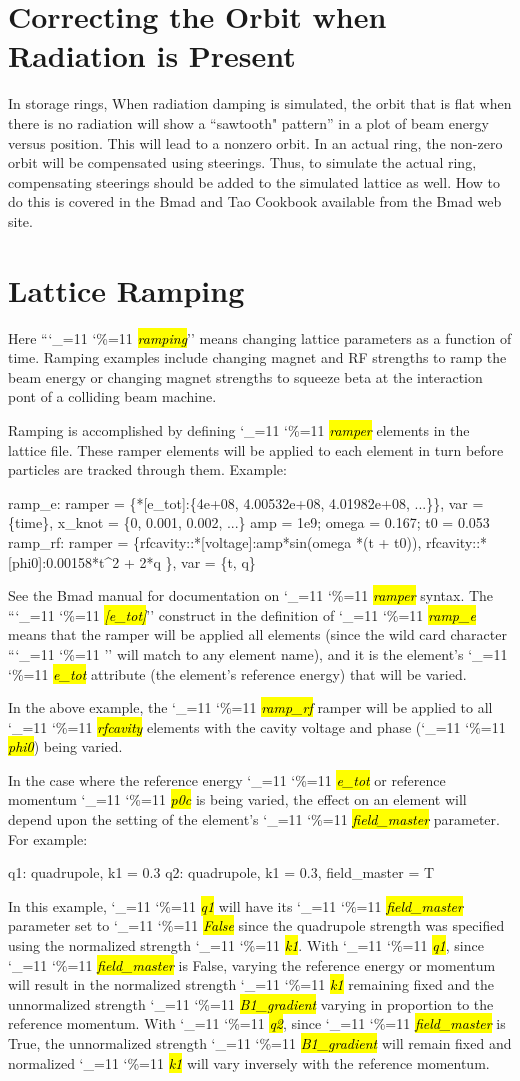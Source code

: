 \documentclass{hitec}
\newcommand\dottcmd[1]{\hl{\em#1}\endgroup}
\newcommand{\vn}{\begingroup\catcode`\_=11 \catcode`\%=11 \dottcmd}
\newcommand{\Section}[1]{\section{#1}\vspace*{-1ex}}
\begin{document}
{{{{{{{{{{%
\Section{Correcting the Orbit when Radiation is Present}

In storage rings, When radiation damping is simulated, the orbit that is flat when there is no
radiation will show a ``sawtooth" pattern'' in a plot of beam energy versus position. This will lead
to a nonzero orbit. In an actual ring, the non-zero orbit will be compensated using steerings. Thus,
to simulate the actual ring, compensating steerings should be added to the simulated lattice as
well. How to do this is covered in the Bmad and Tao Cookbook available from the Bmad web site.

\Section{Lattice Ramping}
\label{s:ramp}

Here ``\vn{ramping}'' means changing lattice parameters as a function of time. Ramping examples
include changing magnet and RF strengths to ramp the beam energy or changing magnet strengths to
squeeze beta at the interaction pont of a colliding beam machine.

Ramping is accomplished by defining \vn{ramper} elements in the lattice file. These ramper elements
will be applied to each element in turn before particles are tracked through them. Example:
\begin{code}
  ramp_e: ramper = \{*[e_tot]:\{4e+08, 4.00532e+08, 4.01982e+08, ...\}\},
                var = \{time\}, x_knot = \{0, 0.001, 0.002, ...\}
  amp = 1e9;  omega = 0.167;  t0 = 0.053
  ramp_rf: ramper = \{rfcavity::*[voltage]:amp*sin(omega *(t + t0)),
        rfcavity::*[phi0]:0.00158*t^2 + 2*q \}, var = \{t, q\}
\end{code}
See the Bmad manual for documentation on \vn{ramper} syntax. The ``\vn{*[e_tot]}'' construct in the
definition of \vn{ramp_e} means that the ramper will be applied all elements (since the wild card
character ``\vn{*}'' will match to any element name), and it is the element's \vn{e_tot} attribute
(the element's reference energy) that will be varied.

In the above example, the \vn{ramp_rf} ramper will be applied to all \vn{rfcavity} elements with
the cavity voltage and phase (\vn{phi0}) being varied.

In the case where the reference energy \vn{e_tot} or reference momentum \vn{p0c} is being varied, the
effect on an element will depend upon the setting of the element's \vn{field_master} parameter. For
example:
\begin{code}
  q1: quadrupole, k1 = 0.3
  q2: quadrupole, k1 = 0.3, field_master = T
\end{code}
In this example, \vn{q1} will have its \vn{field_master} parameter set to \vn{False} since the
quadrupole strength was specified using the normalized strength \vn{k1}. With \vn{q1}, since
\vn{field_master} is False, varying the reference energy or momentum will result in the normalized
strength \vn{k1} remaining fixed and the unnormalized strength \vn{B1_gradient} varying in
proportion to the reference momentum. With \vn{q2}, since \vn{field_master} is True, the
unnormalized strength \vn{B1_gradient} will remain fixed and normalized \vn{k1} will vary
inversely with the reference momentum.

}}}}}}}}}}
\end{document}

